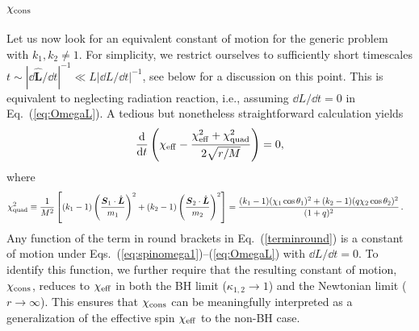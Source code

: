 \documentclass[floats,floatfix,showpacs,amssymb,prd,twocolumn,superscriptaddress,nofootinbib,nolongbibliography,reprint,onecolumn]{revtex4-2}
\begin{document}
\subsection {$\chi_{\rm cons}$}

Let us now look for an equivalent constant of motion for the generic problem with $k_1, k_2 \neq 1$. For simplicity, we restrict ourselves to sufficiently short timescales $t\sim |\dd \hat{\boldsymbol{L}}/\dd t|^{-1}\ll L |\dd L/ \dd t|^{-1}$, see below for a discussion on this point. This is equivalent to neglecting radiation reaction, i.e., assuming $\dd L/ \dd t= 0$ in Eq.~(\ref{eq:OmegaL}).
 A tedious but nonetheless straightforward calculation yields 
\begin{align}
\label{terminround}
\frac{\dd}{\dd t} \left( \chi_{\rm eff}-\frac{\chi_{\rm eff}^2+\chi_{\rm quad}^2}{2 \sqrt{r/M}}\right) =0,
\end{align}
where 
\begin{align}\label{chiquad}
\chi_{\rm quad}^2 & \equiv \frac{1}{M^2} \left[ (k_1-1)\left(\frac{\boldsymbol{S}_1  \cdot \hat{\boldsymbol{L}} }{m_1} \right)^2 +(k_2-1)\left(\frac{\boldsymbol{S}_2  \cdot \hat{\boldsymbol{L}} }{m_2}\right)^2 \right]=   \frac{{(k_1 -1) (\chi_1\cos\theta_1)^2 + (k_2 -1) (q \chi_2\cos\theta_2)^2 }}{(1+q)^2}\,.
\end{align}
Any function of the term in round brackets in Eq.~(\ref{terminround}) is a constant of motion under  Eqs.~(\ref{eq:spinomega1})–(\ref{eq:OmegaL}) with $\dd L/\dd t = 0$. To identify this function, we further require that the resulting constant of motion, $\chi_{\rm cons}$, reduces to $\chi_{\rm eff}$ in both the BH limit ($\kappa_{1,2} \to 1$) and the Newtonian limit ($r \to \infty$). This ensures that $\chi_{\rm cons}$ can be meaningfully interpreted as a generalization of the effective spin $\chi_{\rm eff}$ to the non-BH case.
\end{document}
